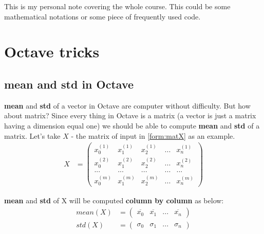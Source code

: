 This is my personal note covering the whole course. This could be some mathematical notations or some piece of frequently used code. 
\section{Octave tricks}
\subsection{\textbf{mean} and \textbf{std} in Octave} \label{subsecMuStdOctave}
\textbf{mean} and \textbf{std} of a vector in Octave are computer without difficulty. But how about matrix? Since every thing in Octave is a matrix (a vector is just a matrix having a dimension equal one) we should be able to compute \textbf{mean} and \textbf{std} of a matrix. Let's take $X$ - the matrix of input in \eqref{form:matX} as an example.
\begin{align*}
X &= \begin{pmatrix}
x_0^{(1)} & x_1^{(1)} & x_2^{(1)} & ... & x_n^{(1)} \\
x_0^{(2)} & x_1^{(2)} & x_2^{(2)} & ... & x_n^{(2)} \\
...       & ...       & ...       & ... & ...\\
x_0^{(m)} & x_1^{(m)} & x_2^{(m)} & ... & x_n^{(m)}
\end{pmatrix}
\end{align*}

\textbf{mean} and \textbf{std} of X will be computed \textbf{column by column} as below:
\begin{align}
mean(X) &= \begin{pmatrix}
\overline{x_0} & \overline{x_1} & ... & \overline{x_n}
\end{pmatrix} \nonumber \\
std(X) &= \begin{pmatrix}
\sigma_0 & \sigma_1 & ... & \sigma_n
\end{pmatrix}
\end{align}


